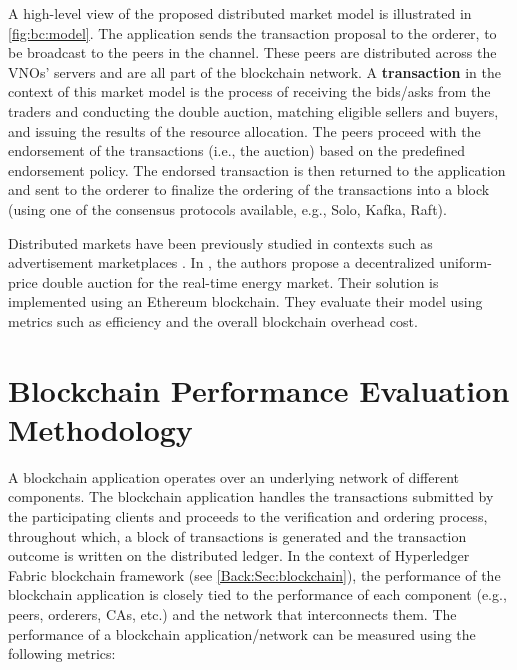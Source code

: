 A high-level view of the proposed distributed market model is illustrated in \autoref{fig:bc:model}. The application sends the transaction proposal to the orderer, to be broadcast to the peers in the channel. These peers are distributed across the \acp{VNO}' servers and are all part of the blockchain network. A \textbf{transaction} in the context of this market model is the process of receiving the bids/asks from the traders and conducting the double auction, matching eligible sellers and buyers, and issuing the results of the resource allocation. The peers proceed with the endorsement of the transactions (i.e., the auction) based on the predefined endorsement policy. The endorsed transaction is then returned to the application and sent to the orderer to finalize the ordering of the transactions into a block (using one of the consensus protocols available, e.g., Solo, Kafka, Raft).

Distributed markets have been previously studied in contexts such as advertisement marketplaces \cite{Ranganthan2018ADM}. In \cite{FOTI2019113604}, the authors propose a decentralized uniform-price double auction for the real-time energy market. Their solution is implemented using an Ethereum blockchain. They evaluate their model using metrics such as efficiency and the overall blockchain overhead cost. 

\section{Blockchain Performance Evaluation Methodology}
\label{sec:BC:methodology}
A blockchain application operates over an underlying network of different components. The blockchain application handles the transactions submitted by the participating clients and proceeds to the verification and ordering process, throughout which, a block of transactions is generated and the transaction outcome is written on the distributed ledger.
In the context of Hyperledger Fabric blockchain framework (see \autoref{Back:Sec:blockchain}), the performance of the blockchain application is closely tied to the performance of each component (e.g., peers, orderers, \acp{CA}, etc.) and the network that interconnects them. The performance of a blockchain application/network can be measured using the following metrics:



